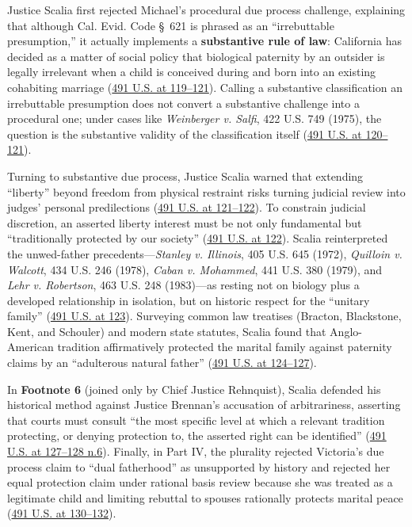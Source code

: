 \documentclass[12pt]{article}
\begin{document}
Justice Scalia first rejected Michael's procedural due process challenge, explaining that although Cal. Evid. Code \S~621 is phrased as an ``irrebuttable presumption,'' it actually implements a \textbf{substantive rule of law}: California has decided as a matter of social policy that biological paternity by an outsider is legally irrelevant when a child is conceived during and born into an existing cohabiting marriage (\href{https://supreme.justia.com/cases/federal/us/491/110/}{491 U.S. at 119--121}). Calling a substantive classification an irrebuttable presumption does not convert a substantive challenge into a procedural one; under cases like \textit{Weinberger v. Salfi}, 422 U.S. 749 (1975), the question is the substantive validity of the classification itself (\href{https://supreme.justia.com/cases/federal/us/491/110/}{491 U.S. at 120--121}).

Turning to substantive due process, Justice Scalia warned that extending ``liberty'' beyond freedom from physical restraint risks turning judicial review into judges' personal predilections (\href{https://supreme.justia.com/cases/federal/us/491/110/}{491 U.S. at 121--122}). To constrain judicial discretion, an asserted liberty interest must be not only fundamental but ``traditionally protected by our society'' (\href{https://supreme.justia.com/cases/federal/us/491/110/}{491 U.S. at 122}). Scalia reinterpreted the unwed-father precedents---\textit{Stanley v. Illinois}, 405 U.S. 645 (1972), \textit{Quilloin v. Walcott}, 434 U.S. 246 (1978), \textit{Caban v. Mohammed}, 441 U.S. 380 (1979), and \textit{Lehr v. Robertson}, 463 U.S. 248 (1983)---as resting not on biology plus a developed relationship in isolation, but on historic respect for the ``unitary family'' (\href{https://supreme.justia.com/cases/federal/us/491/110/}{491 U.S. at 123}). Surveying common law treatises (Bracton, Blackstone, Kent, and Schouler) and modern state statutes, Scalia found that Anglo-American tradition affirmatively protected the marital family against paternity claims by an ``adulterous natural father'' (\href{https://supreme.justia.com/cases/federal/us/491/110/}{491 U.S. at 124--127}).

In \textbf{Footnote 6} (joined only by Chief Justice Rehnquist), Scalia defended his historical method against Justice Brennan's accusation of arbitrariness, asserting that courts must consult ``the most specific level at which a relevant tradition protecting, or denying protection to, the asserted right can be identified'' (\href{https://supreme.justia.com/cases/federal/us/491/110/}{491 U.S. at 127--128 n.6}). Finally, in Part IV, the plurality rejected Victoria's due process claim to ``dual fatherhood'' as unsupported by history and rejected her equal protection claim under rational basis review because she was treated as a legitimate child and limiting rebuttal to spouses rationally protects marital peace (\href{https://supreme.justia.com/cases/federal/us/491/110/}{491 U.S. at 130--132}).
\end{document}
